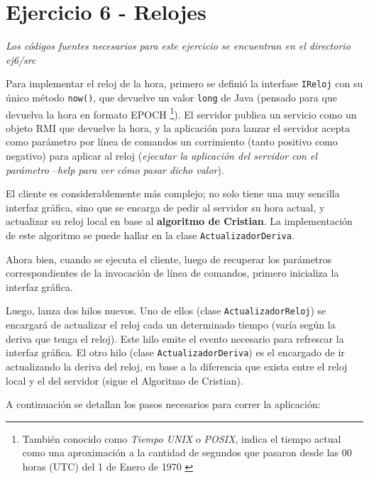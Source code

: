 \section{Ejercicio 6 - Relojes}

\emph{Los códigos fuentes necesarios para este ejercicio se encuentran en el directorio \emph{ej6/src}} 

Para implementar el reloj de la hora, primero se definió la interfase \texttt{IReloj} con su único método \texttt{now()}, que devuelve un valor \texttt{long} de Java (pensado para que devuelva la hora en formato EPOCH \footnote{También conocido como \emph{Tiempo UNIX} o \emph{POSIX}, indica el tiempo actual como una aproximación a la cantidad de segundos que pasaron desde las 00 horas (UTC) del 1 de Enero de 1970 \autocite{WikipediaEpoch}}). El servidor publica un servicio como un objeto RMI que devuelve la hora, y la aplicación para lanzar el servidor acepta como parámetro por línea de comandos un corrimiento (tanto positivo como negativo) para aplicar al reloj (\emph{ejecutar la aplicación del servidor con el parámetro \emph{--help} para ver cómo pasar dicho valor}).

El cliente es considerablemente más complejo; no solo tiene una muy sencilla interfaz gráfica, sino que se encarga de pedir al servidor su hora actual, y actualizar su reloj local en base al \textbf{algoritmo de Cristian}. La implementación de este algoritmo se puede hallar en la clase \texttt{ActualizadorDeriva}.

Ahora bien, cuando se ejecuta el cliente, luego de recuperar los parámetros correspondientes de la invocación de línea de comandos, primero inicializa la interfaz gráfica.

Luego, lanza dos hilos nuevos. Uno de ellos (clase \texttt{ActualizadorReloj}) se encargará de actualizar el reloj cada un determinado tiempo (varía según la deriva que tenga el reloj). Este hilo emite el evento necesario para refrescar la interfaz gráfica. El otro hilo (clase \texttt{ActualizadorDeriva}) es el encargado de ir actualizando la deriva del reloj, en base a la diferencia que exista entre el reloj local y el del servidor (sigue el Algoritmo de Cristian).

A continuación se detallan los pasos necesarios para correr la aplicación:

